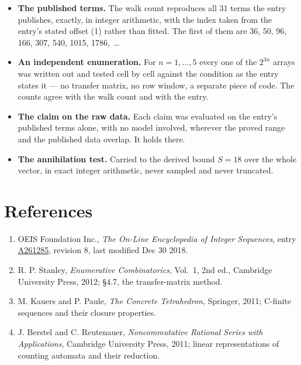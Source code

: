 \documentclass[11pt]{article}
\theoremstyle{definition}
\begin{document}
\begin{itemize}

\item {\bfseries The published terms.} The walk count reproduces all 31 terms the entry publishes, exactly, in integer arithmetic, with the index taken from the entry's stated offset (1) rather than fitted. The first of them are 36, 50, 96, 166, 307, 540, 1015, 1786,~\dots

\item {\bfseries An independent enumeration.} For $n = 1,\dots,5$ every one of the $2^{3n}$ arrays was written out and tested cell by cell against the condition as the entry states it --- no transfer matrix, no row window, a separate piece of code. The counts agree with the walk count and with the entry.

\item {\bfseries The claim on the raw data.} Each claim was evaluated on the entry's published terms alone, with no model involved, wherever the proved range and the published data overlap. It holds there.

\item {\bfseries The annihilation test.} Carried to the derived bound $S = 18$ over the whole vector, in exact integer arithmetic, never sampled and never truncated.

\end{itemize}

\section{References}

\begin{enumerate}

\item OEIS Foundation Inc., \emph{The On-Line Encyclopedia of Integer Sequences}, entry \href{https://oeis.org/A261285}{A261285}, revision 8, last modified Dec 30 2018.

\item R. P. Stanley, \emph{Enumerative Combinatorics}, Vol.~1, 2nd ed., Cambridge University Press, 2012; \S4.7, the transfer-matrix method.

\item M. Kauers and P. Paule, \emph{The Concrete Tetrahedron}, Springer, 2011; C-finite sequences and their closure properties.

\item J. Berstel and C. Reutenauer, \emph{Noncommutative Rational Series with Applications}, Cambridge University Press, 2011; linear representations of counting automata and their reduction.

\end{enumerate}
\end{document}
